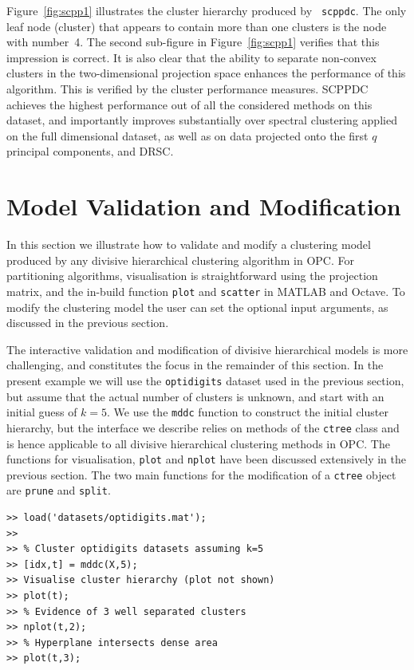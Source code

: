\documentclass{book}
\begin{document}
\noindent
%
Figure~\ref{fig:scpp1} illustrates the cluster hierarchy produced by {\tt
scppdc}.
%
The only leaf node (cluster) that appears to contain more than one clusters is
the node with number~4. The second sub-figure in Figure~\ref{fig:scpp1}
verifies that this impression is correct. It is also clear that the ability to
separate non-convex clusters in the two-dimensional projection space enhances
the performance of this algorithm.
%
This is verified by the cluster performance measures. SCPPDC achieves the
highest performance out of all the considered methods on this dataset, and
importantly improves substantially over spectral clustering applied on the full
dimensional dataset, as well as on data projected onto the first $q$ principal
components, and DRSC.







\chapter{Model Validation and Modification}\label{sec:valid}

In this section we illustrate how to validate and modify a clustering model
produced by any divisive hierarchical clustering algorithm in OPC.
%
For partitioning algorithms, visualisation is straightforward using the
projection matrix, and the in-build function {\tt plot} and {\tt scatter} in
MATLAB and Octave. To modify the clustering model the user can set the optional
input arguments, as discussed in the previous section.


The interactive validation and modification of divisive hierarchical models is
more challenging, and constitutes the focus in the remainder of this section.
%
In the present example we will use the {\tt optidigits} dataset used in the
previous section, but assume that the actual number of clusters is unknown, and
start with an initial guess of $k=5$.
%
We use the {\tt mddc} function to construct the initial cluster hierarchy, but
the interface we describe relies on methods of the {\tt ctree} class and is
hence applicable to all divisive hierarchical clustering methods in OPC.
%
The functions for visualisation, {\tt plot} and {\tt nplot} have been discussed
extensively in the previous section. The two main functions for the
modification of a {\tt ctree} object are {\tt prune} and {\tt split}.


\begin{lstlisting}
>> load('datasets/optidigits.mat');
>>
>> % Cluster optidigits datasets assuming k=5
>> [idx,t] = mddc(X,5);
>> Visualise cluster hierarchy (plot not shown)
>> plot(t);
>> % Evidence of 3 well separated clusters
>> nplot(t,2);
>> % Hyperplane intersects dense area
>> plot(t,3);
\end{lstlisting}
\end{document}
